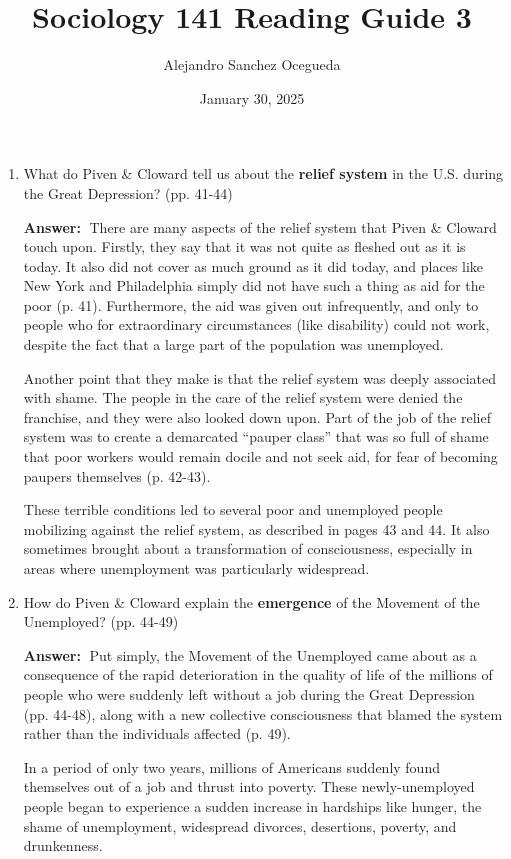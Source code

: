 \documentclass{article}
\title{Sociology 141 Reading Guide 3}
\author{Alejandro Sanchez Ocegueda}
\date{January 30, 2025}
\newcommand{\answer}{\textbf{Answer:}$\;$}
\begin{document}
\maketitle

\begin{enumerate}[label=\arabic*)]
    \item What do Piven \& Cloward tell us about the \textbf{relief system} in the U.S. during the Great Depression? (pp. 41-44)

    \answer 
    There are many aspects of the relief system that Piven \& Cloward touch upon.
    Firstly, they say that it was not quite as fleshed out as it is today.
    It also did not cover as much ground as it did today, and places like New York and Philadelphia simply did not have such a thing as aid for the poor (p. 41).
    Furthermore, the aid was given out infrequently, and only to people who for extraordinary circumstances (like disability) could not work, despite the fact that a large part of the population was unemployed.
    
    Another point that they make is that the relief system was deeply associated with shame.
    The people in the care of the relief system were denied the franchise, and they were also looked down upon.
    Part of the job of the relief system was to create a demarcated ``pauper class'' that was so full of shame that poor workers would remain docile and not seek aid, for fear of becoming paupers themselves (p. 42-43).

    These terrible conditions led to several poor and unemployed people mobilizing against the relief system, as described in pages 43 and 44.
    It also sometimes brought about a transformation of consciousness, especially in areas where unemployment was particularly widespread.

    \item How do Piven \& Cloward explain the \textbf{emergence} of the Movement of the Unemployed? (pp. 44-49)

    \answer
    Put simply, the Movement of the Unemployed came about as a consequence of the rapid deterioration in the quality of life of the millions of people who were suddenly left without a job during the Great Depression (pp. 44-48), along with a new collective consciousness that blamed the system rather than the individuals affected (p. 49).

    In a period of only two years, millions of Americans suddenly found themselves out of a job and thrust into poverty.
    These newly-unemployed people began to experience a sudden increase in hardships like hunger, the shame of unemployment, widespread divorces, desertions, poverty, and drunkenness.
    

\end{enumerate}
\end{document}
